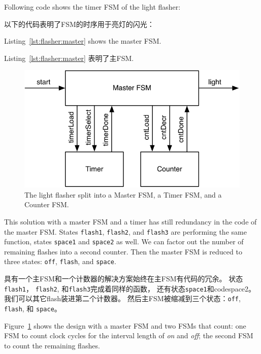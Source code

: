 \documentclass[%
    10pt,
    headinclude, footexclude,
    openright, %
    notitlepage,
    cleardoubleempty,
    headsepline,
    pointlessnumbers,
    bibtotoc, idxtotoc,
    ]{scrbook}
\newcommand{\code}[1]{{\small{\texttt{#1}}}}
\newcommand{\scale}{0.7}
\begin{document}
\noindent Following code shows the timer FSM of the light flasher:

\noindent 以下的代码表明了FSM的时序用于亮灯的闪光：


\noindent Listing~\ref{lst:flasher:master} shows the master FSM.

\noindent Listing~\ref{lst:flasher:master} 表明了主FSM.



\begin{figure}
  \centering
  \includegraphics[scale=\scale]{figures/flasher2}
  \caption{The light flasher split into a Master FSM, a Timer FSM, and a Counter FSM.}
  \label{fig:flasher2}
\end{figure}

This solution with a master FSM and a timer has still redundancy in the code
of the master FSM. States \code{flash1}, \code{flash2}, and \code{flash3}
are performing the same function, states \code{space1} and \code{space2} as well.
We can factor out the number of remaining flashes into a second counter.
Then the master FSM is reduced to three states: \code{off}, \code{flash},
and \code{space}.

具有一个主FSM和一个计数器的解决方案始终在主FSM有代码的冗余。
状态\code{flash1}， \code{flash2}, 和\code{flash3}完成着同样的函数，
还有状态\code{space1}和code{space2}。
我们可以其它flash装进第二个计数器。
然后主FSM被缩减到三个状态：\code{off}, \code{flash},
和 \code{space}。


Figure~\ref{fig:flasher2} shows the design with a master FSM and two FSMs
that count: one FSM to count clock cycles for the interval length of \emph{on}
and \emph{off}; the second FSM to count the remaining flashes.
\end{document}
